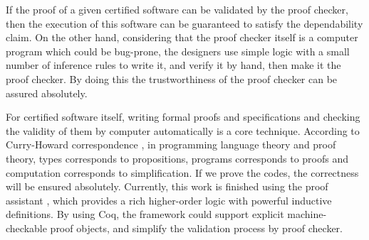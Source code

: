 \documentclass[10pt, conference, compsocconf]{IEEEtran}
\begin{document}
If the proof of a given certified software can be validated by the proof checker, then the execution of this software can be guaranteed to satisfy the dependability claim. On the other hand, considering that the proof checker itself is a computer program which could be bug-prone, the designers use simple logic with a small number of inference rules to write it, and verify it by hand, then make it the proof checker. By doing this the trustworthiness of the proof checker can be assured absolutely. 

For certified software itself, writing formal proofs and specifications and checking the validity of them by computer automatically is a core technique. According to Curry-Howard correspondence \cite{haskell}, in programming language theory and proof theory, types corresponds to propositions, programs corresponds to proofs and computation corresponds to simplification. If we prove the codes, the correctness will be ensured absolutely. Currently, this work is finished using the proof assistant \cite{coq}, which provides a rich higher-order logic with powerful inductive definitions. By using Coq, the framework could support explicit machine-checkable proof objects, and simplify the validation process by proof checker.


%
%

\end{document}
